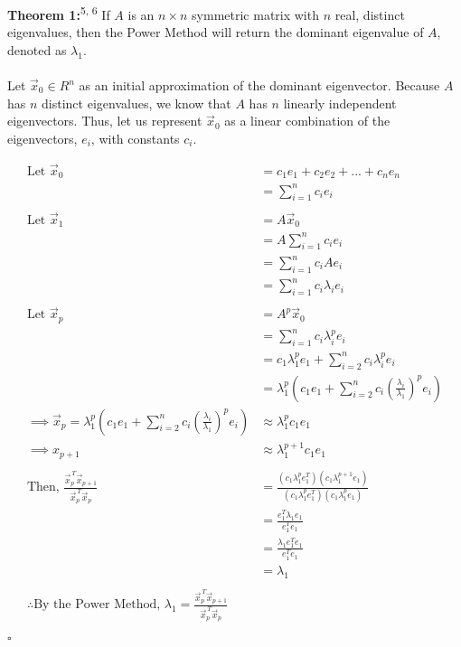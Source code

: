 \documentclass{article}
\begin{document}
\noindent \textbf{Theorem 1:}\textsuperscript{5, 6} If $A$ is an $n \times n$ symmetric matrix with $n$ real, distinct eigenvalues, then the Power Method will return the dominant eigenvalue of $A$, denoted as $\lambda_1$. \\\\

\noindent Let $\vec{x}^{\,}_0 \in R^n$ as an initial approximation of the dominant eigenvector. Because $A$ has $n$ distinct eigenvalues, we know that $A$ has $n$ linearly independent eigenvectors. Thus, let us represent $\vec{x}^{\,}_0$ as a linear combination of the eigenvectors, $e_i$, with constants $c_i$.

\begin{align*}
    \text{Let } \vec{x}^{\,}_0 &= c_1e_1 + c_2e_2 + ... + c_ne_n \tag{i.e. an approximation of one of the dominant eigenvectors of $A$}\\
    &=\sum_{i=1}^{n} c_ie_i \tag{by summation form}\\\\
    \text{Let }\vec{x}^{\,}_1 &= A\vec{x}^{\,}_0\\
    &=A\sum_{i=1}^{n} c_ie_i \tag{by summation form}\\
    &=\sum_{i=1}^{n} c_iAe_i \tag{by linearity}\\
    &=\sum_{i=1}^{n} c_i\lambda_i e_i \tag{by $Ae_i = \lambda_i e_i$}\\\\
    \text{Let }\vec{x}^{\,}_p &= A^p\vec{x}^{\,}_0\\
    &= \sum_{i=1}^{n} c_i\lambda^p_i e_i \tag{by powers of a diagonalizable matrix}\\
    &=c_1\lambda^p_1e_1 + \sum_{i=2}^{n} c_i\lambda^p_i e_i \tag{by factorization}\\  
    &=\lambda^p_1(c_1e_1 + \sum_{i=2}^{n} c_i(\frac{\lambda_i}{\lambda_1})^pe_i) \tag{by factorization}\\ 
    \implies \vec{x}^{\,}_p = \lambda^p_1(c_1e_1 + \sum_{i=2}^{n} c_i(\frac{\lambda_i}{\lambda_1})^pe_i) &\approx \lambda^p_1c_1e_1\tag{by Lemma 1}\\
    \implies x_{p+1} &\approx\lambda^{p+1}_1c_1e_1\\\\
    \text{Then, }\frac{\vec{x}^{\,T}_p\vec{x}^{\,}_{p+1}}{\vec{x}^{\,T}_p\vec{x}^{\,}_{p}} &= \frac{(c_1\lambda^p_1e^T_1)(c_1\lambda^{p+1}_1e_1)}{(c_1\lambda^p_1e^T_1)(c_1\lambda^p_1e_1)}\tag{by substitution}\\
    &=\frac{e^T_1\lambda_1e_1}{e^T_1e_1}\tag{by division of constants}\\
    &=\frac{\lambda_1e^T_1e_1}{e^T_1e_1}\tag{by linearity}\\
    &=\lambda_1 \tag{by division of constants (dot product of $e^T_1e_1$ results in a constant)}\\\\
    \therefore \text{By the Power Method, }\lambda_1 = \frac{\vec{x}^{\,T}_p\vec{x}^{\,}_{p+1}}{\vec{x}^{\,T}_p\vec{x}^{\,}_{p}}
\end{align*}
\begin{flushright}
    $\square$
\end{flushright}
\end{document}

